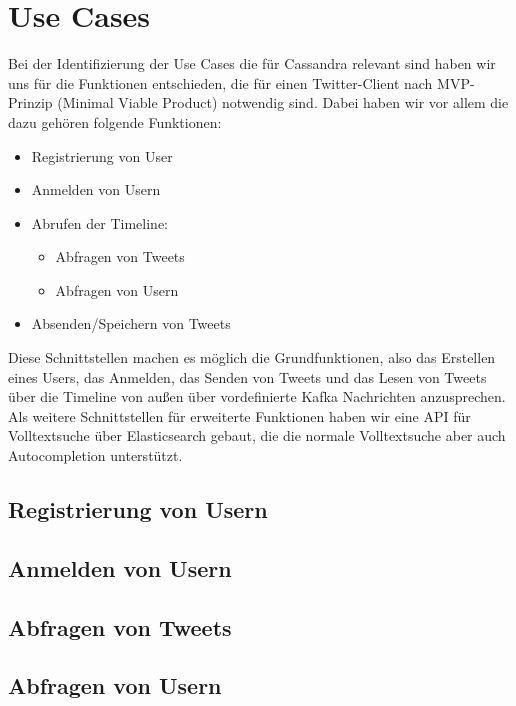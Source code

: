 \section{Use Cases}
\label{sec:usecase}
Bei der Identifizierung der Use Cases die für Cassandra relevant sind haben wir uns für die Funktionen entschieden, die für einen Twitter-Client nach MVP-Prinzip (Minimal Viable Product) notwendig sind. Dabei haben wir vor allem die dazu gehören folgende Funktionen:
\begin{itemize}
	\item Registrierung von User
	\item Anmelden von Usern
	\item Abrufen der Timeline:
		\begin{itemize}
			\item Abfragen von Tweets
			\item Abfragen von Usern
		\end{itemize}
	\item Absenden/Speichern von Tweets
\end{itemize}
Diese Schnittstellen machen es möglich die Grundfunktionen, also das Erstellen eines Users, das Anmelden, das Senden von Tweets und das Lesen von Tweets über die Timeline von außen über vordefinierte Kafka Nachrichten anzusprechen.
Als weitere Schnittstellen für erweiterte Funktionen haben wir eine API für Volltextsuche über Elasticsearch gebaut, die die normale Volltextsuche aber auch Autocompletion unterstützt.\\ 




\subsection{Registrierung von Usern}

\subsection{Anmelden von Usern}

\subsection{Abfragen von Tweets}

\subsection{Abfragen von Usern}

